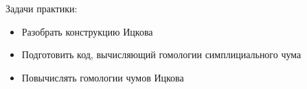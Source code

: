 \documentclass[a4paper, 17pt]{article}
\begin{document}
\\\\
Задачи практики:
\begin{itemize}
    \item Разобрать конструкцию Ицкова
    \item Подготовить код, вычисляющий гомологии симплициального чума
    \item Повычислять гомологии чумов Ицкова
    
    
\end{itemize}
\end{document}
